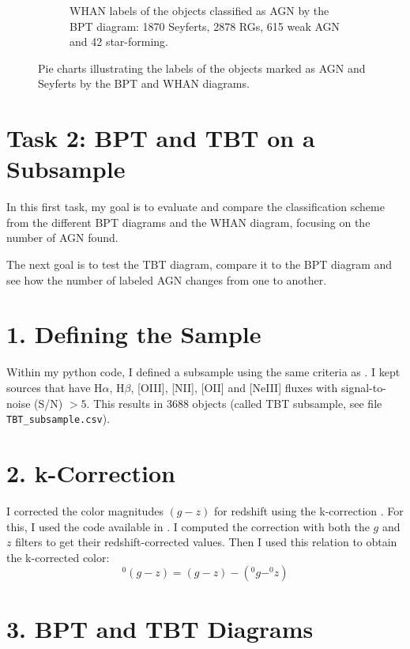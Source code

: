 \documentclass[letterpaper, oneside]{article}
\begin{document}
\begin{figure}[H]
\begin{subfigure}[b]{0.4\textwidth}
			\caption{WHAN labels of the objects classified as AGN by the BPT diagram: 1870 Seyferts, 2878 RGs, 615 weak AGN and 42 star-forming.}
			\label{fig:agn_whan_label_pie}
		\end{subfigure}
		\caption{Pie charts illustrating the labels of the objects marked as AGN and Seyferts by the BPT and WHAN diagrams.}
		\label{fig:pie_charts}
	\end{figure}
	
	
	
	\section*{Task 2: BPT and TBT on a Subsample}
	
	In this first task, my goal is to evaluate and compare the classification scheme from the different BPT diagrams and the WHAN diagram, focusing on the number of AGN found.
	
	The next goal is to test the TBT diagram, compare it to the BPT diagram and see how the number of labeled AGN changes from one to another.

	\section*{1. Defining the Sample}
	
	Within my python code, I defined a subsample using the same criteria as \cite{TBT_2011}. I kept sources that have  H$\alpha$, H$\beta$, [OIII], [NII], [OII] and [NeIII] fluxes with signal-to-noise (S/N) $> 5$. This results in 3688 objects (called TBT subsample, see file \texttt{TBT\_subsample.csv}).

	\section*{2. k-Correction}
	
	I corrected the color magnitudes $(g-z)$ for redshift using the k-correction \cite{Chilingarian_2010}. For this, I used the code available in \cite{kcorr_code}. I computed the correction with both the $g$ and $z$ filters to get their redshift-corrected values. Then I used this relation to obtain the k-corrected color:
	\begin{equation} \label{kcorrection}
		^0(g-z) = (g-z) - (^0g - ^0z)
	\end{equation}
	
	\section*{3. BPT and TBT Diagrams}
	
\end{document}
